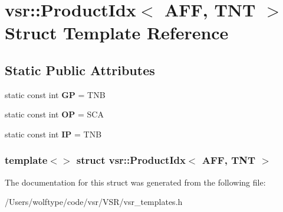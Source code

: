 \hypertarget{structvsr_1_1_product_idx_3_01_a_f_f_00_01_t_n_t_01_4}{\section{vsr\-:\-:Product\-Idx$<$ A\-F\-F, T\-N\-T $>$ Struct Template Reference}
\label{structvsr_1_1_product_idx_3_01_a_f_f_00_01_t_n_t_01_4}
}
\subsection*{Static Public Attributes}
\begin{DoxyCompactItemize}
\item 
\hypertarget{structvsr_1_1_product_idx_3_01_a_f_f_00_01_t_n_t_01_4_ad7a8b2bd2c99793b92a5c8d38ebd6abd}{static const int {\bfseries G\-P} = T\-N\-B}\label{structvsr_1_1_product_idx_3_01_a_f_f_00_01_t_n_t_01_4_ad7a8b2bd2c99793b92a5c8d38ebd6abd}

\item 
\hypertarget{structvsr_1_1_product_idx_3_01_a_f_f_00_01_t_n_t_01_4_a2c0add2cb1a7db79f931dd50b3a12eca}{static const int {\bfseries O\-P} = S\-C\-A}\label{structvsr_1_1_product_idx_3_01_a_f_f_00_01_t_n_t_01_4_a2c0add2cb1a7db79f931dd50b3a12eca}

\item 
\hypertarget{structvsr_1_1_product_idx_3_01_a_f_f_00_01_t_n_t_01_4_aa8e262045b2dc0938fd49448390c89c1}{static const int {\bfseries I\-P} = T\-N\-B}\label{structvsr_1_1_product_idx_3_01_a_f_f_00_01_t_n_t_01_4_aa8e262045b2dc0938fd49448390c89c1}

\end{DoxyCompactItemize}
\subsubsection*{template$<$$>$ struct vsr\-::\-Product\-Idx$<$ A\-F\-F, T\-N\-T $>$}



The documentation for this struct was generated from the following file\-:\begin{DoxyCompactItemize}
\item 
/\-Users/wolftype/code/vsr/\-V\-S\-R/vsr\-\_\-templates.\-h\end{DoxyCompactItemize}
